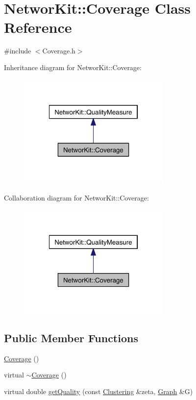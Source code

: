 \hypertarget{class_networ_kit_1_1_coverage}{\section{Networ\-Kit\-:\-:Coverage Class Reference}
\label{class_networ_kit_1_1_coverage}
}


{\ttfamily \#include $<$Coverage.\-h$>$}



Inheritance diagram for Networ\-Kit\-:\-:Coverage\-:\nopagebreak
\begin{figure}[H]
\begin{center}
\leavevmode
\includegraphics[width=214pt]{class_networ_kit_1_1_coverage__inherit__graph}
\end{center}
\end{figure}


Collaboration diagram for Networ\-Kit\-:\-:Coverage\-:\nopagebreak
\begin{figure}[H]
\begin{center}
\leavevmode
\includegraphics[width=214pt]{class_networ_kit_1_1_coverage__coll__graph}
\end{center}
\end{figure}
\subsection*{Public Member Functions}
\begin{DoxyCompactItemize}
\item 
\hyperlink{class_networ_kit_1_1_coverage_a768d5cd8b011f50300c1f6e667b465bc}{Coverage} ()
\item 
virtual \hyperlink{class_networ_kit_1_1_coverage_a1457a5ca9ac430e056a899fe1ff45484}{$\sim$\-Coverage} ()
\item 
virtual double \hyperlink{class_networ_kit_1_1_coverage_a459bd590841ca37e6081b39213486f75}{get\-Quality} (const \hyperlink{class_networ_kit_1_1_clustering}{Clustering} \&zeta, \hyperlink{class_networ_kit_1_1_graph}{Graph} \&G)
\end{DoxyCompactItemize}


